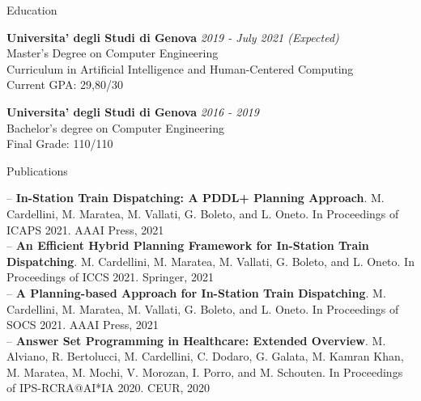 \documentclass{resume} %
\begin{document}

\begin{rSection}{Education}

{\bf Universita' degli Studi di Genova} \hfill {\em 2019 - July 2021 (Expected)} \\ 
Master's Degree on Computer Engineering \\
Curriculum in Artificial Intelligence and Human-Centered Computing \\
Current GPA: 29,80/30

{\bf Universita' degli Studi di Genova} \hfill {\em 2016 - 2019} \\ 
Bachelor's degree on Computer Engineering \\
Final Grade: 110/110 \\


\end{rSection}



\begin{rSection}{Publications}

-- \textbf{In-Station Train Dispatching: A PDDL+ Planning Approach}. M. Cardellini, M. Maratea, M. Vallati, G. Boleto, and L. Oneto. In Proceedings of ICAPS 2021. AAAI Press, 2021 \\
-- \textbf{An Efficient Hybrid Planning Framework for In-Station Train Dispatching}. M. Cardellini, M. Maratea, M. Vallati, G. Boleto, and L. Oneto. In Proceedings of ICCS 2021. Springer, 2021 \\
-- \textbf{A Planning-based Approach for In-Station Train Dispatching}. M. Cardellini, M. Maratea, M. Vallati, G. Boleto, and L. Oneto. In Proceedings of SOCS 2021. AAAI Press, 2021\\
-- \textbf{Answer Set Programming in Healthcare: Extended Overview}. M. Alviano, R. Bertolucci, M. Cardellini, C. Dodaro, G. Galata, M. Kamran Khan, M. Maratea, M. Mochi, V. Morozan, I. Porro, and M. Schouten. In Proceedings of IPS-RCRA@AI*IA 2020. CEUR, 2020
	
\end{rSection}
\end{document}
